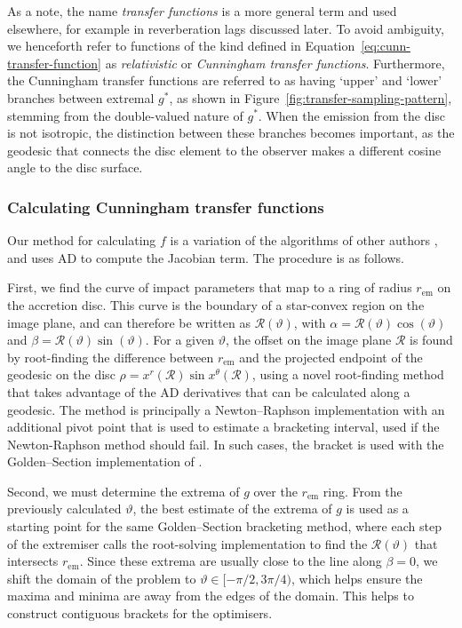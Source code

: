 \documentclass[fleqn,usenatbib]{mnras}
\newcommand{\rhoem}{r_\text{em}}
\begin{document}
As a note, the name \emph{transfer functions} is a more general term and used
elsewhere, for example in reverberation lags discussed later. To avoid
ambiguity, we henceforth refer to functions of the kind defined in
Equation~\eqref{eq:cunn-transfer-function} as \emph{relativistic} or
\emph{Cunningham transfer functions}. Furthermore, the Cunningham transfer
functions are referred to as having `upper' and `lower' branches between
extremal $g^\ast$, as shown in Figure~\ref{fig:transfer-sampling-pattern},
stemming from the double-valued nature of $g^\ast$. When the emission from the
disc is not isotropic, the distinction between these branches becomes important,
as the geodesic that connects the disc element to the observer makes a different
cosine angle to the disc surface.

\subsubsection{Calculating Cunningham transfer functions}

Our method for calculating $f$ is a variation of the algorithms of other authors
\citep{speith_photon_1995,bambi_testing_2017,abdikamalov_public_2019}, and uses
AD to compute the Jacobian term. The procedure is as follows.

First, we find the curve of impact parameters that map to a ring of radius
$\rhoem$ on the accretion disc. This curve is the boundary of a star-convex
region on the image plane, and can therefore be written as
$\mathcal{R}(\vartheta)$, with $\alpha = \mathcal{R}(\vartheta) \cos(\vartheta)$
and $\beta = \mathcal{R}(\vartheta) \sin(\vartheta)$. For a given $\vartheta$,
the offset on the image plane $\mathcal{R}$ is found by root-finding the
difference between $\rhoem$ and the projected endpoint of the geodesic on
the disc $\rho = x^r (\mathcal{R}) \sin x^\theta(\mathcal{R})$, using a novel
root-finding method that takes advantage of the AD derivatives that can be
calculated along a geodesic. The method is principally a Newton--Raphson
implementation with an additional pivot point that is used to estimate a
bracketing interval, used if the Newton-Raphson method should fail. In such
cases, the bracket is used with the Golden--Section implementation of
\citep{Optim.jl-2018}.

Second, we must determine the extrema of $g$ over the $\rhoem$ ring. From the
previously calculated $\vartheta$, the best estimate of the extrema of $g$ is
used as a starting point for the same Golden--Section bracketing method, where
each step of the extremiser calls the root-solving implementation to find the
$\mathcal{R}(\vartheta)$ that intersects $\rhoem$. Since these extrema are
usually close to the line along $\beta = 0$, we shift the domain of the problem
to $\vartheta \in [ -\pi/2, 3\pi/4)$, which helps ensure the maxima and minima
are away from the edges of the domain. This helps to construct contiguous
brackets for the optimisers.
\end{document}
